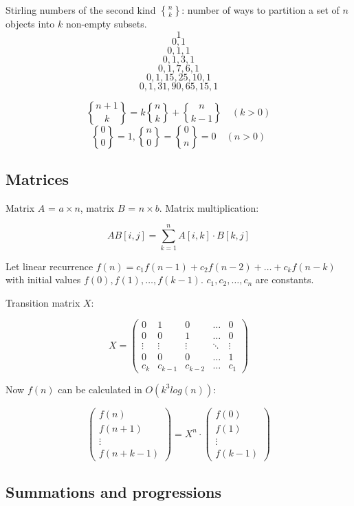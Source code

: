 \documentclass{article}
\DeclareRobustCommand{\stirling}{\genfrac\{\}{0pt}{}} %
\begin{document}
Stirling numbers of the second kind $\stirling{n}{k}$: number of ways to partition a set of $n$ objects into $k$ non-empty subsets.
\[ 1 \] \[ 0, 1 \] \[0, 1, 1 \] \[0, 1, 3, 1 \] \[ 0, 1, 7, 6, 1 \] \[ 0, 1, 15, 25, 10, 1 \] \[ 0, 1, 31, 90, 65, 15, 1 \]

\[ \stirling{n+1}{k} = k\stirling{n}{k}+\stirling{n}{k-1} \quad (k > 0) \] 
\[ \stirling{0}{0} = 1, \stirling{n}{0} = \stirling{0}{n} = 0 \quad (n > 0) \]

\subsection {Matrices}

Matrix $A$ = $a \times n$, matrix $B$ = $n \times b$. Matrix multiplication:

\[ AB[i,j] = \sum_{k=1}^{n} A[i,k] \cdot B[k,j] \]

Let linear recurrence $f(n) = c_1f(n-1) + c_2f(n-2) + \dots + c_kf(n-k)$ with initial values $f(0), f(1), \dots, f(k-1)$. $c_1, c_2, \dots, c_n$ are constants.

Transition matrix $X$:

\[
	X =
	\begin{pmatrix}
		0 & 1 & 0 & \dots & 0 \\
		0 & 0 & 1 & \dots & 0 \\
		\vdots & \vdots & \vdots & \ddots & \vdots \\
		0 & 0 & 0 & \dots & 1 \\
		c_k & c_{k-1} & c_{k-2} & \dots & c_1
	\end{pmatrix}
\]

Now $f(n)$ can be calculated in $O(k^3 log(n))$:

\[
	\begin{pmatrix}
		f(n) \\
		f(n+1) \\
		\vdots \\
		f(n+k-1)
	\end{pmatrix}
	= X^n \cdot
	\begin{pmatrix}
		f(0) \\
		f(1) \\
		\vdots \\
		f(k-1)
	\end{pmatrix}
\]



\subsection {Summations and progressions}
\end{document}
